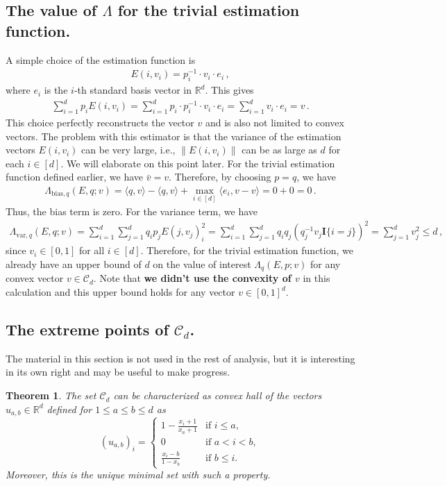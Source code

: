 \documentclass{article}
\theoremstyle{plain}
\newtheorem{theorem}{Theorem}
\theoremstyle{definition}
\theoremstyle{plain}
\newcommand{\R}{\mathbb R}
\newcommand{\cC}{\mathcal C}
\begin{document}
\subsection{The value of $\Lambda$ for the trivial estimation function.}
A simple choice of the estimation function is
\begin{align}
    E(i, v_i) = p_i^{-1} \cdot v_i \cdot e_i\,,
\end{align}
where $e_i$ is the $i$-th standard basis vector in $\R^d$.
This gives
\begin{align}
    \sum_{i=1}^d p_i E(i, v_i) = \sum_{i=1}^d p_i \cdot p_i^{-1} \cdot v_i \cdot e_i = \sum_{i=1}^d v_i \cdot e_i = v\,.
\end{align}
This choice perfectly reconstructs the vector $v$ and is also not limited to convex vectors.
The problem with this estimator is that the variance of the estimation vectors $E(i, v_i)$ can be very large,
i.e., $\|E(i, v_i)\|$ can be as large as $d$ for each $i \in [d]$. We will elaborate on this point later.
For the trivial estimation function defined earlier, we have $\bar{v} = v$.
Therefore, by choosing $p =q$, we have
\begin{align}
    \Lambda_{\text{bias}, q}(E, q ; v)
    = \langle q, v\rangle - \langle q, v \rangle
    + \max_{i \in [d]} \langle e_i, v - v \rangle
    = 0 + 0 = 0\,.
\end{align}
Thus, the bias term is zero.
For the variance term, we have
\begin{align}
    \Lambda_{\text{var}, q}(E, q ; v)
    =
    \sum_{i=1}^d \sum_{j=1}^d q_i p_j E(j, v_j)_i^2
    = \sum_{i=1}^d \sum_{j=1}^d q_i q_j \left( q_j^{-1} v_j \mathbf{I}\{i= j\} \right)^2
    = \sum_{j=1}^d v_j^2 \leq d\,,
\end{align}
since $v_i \in [0, 1]$ for all $i \in [d]$.
Therefore, for the trivial estimation function, we already have an upper bound of $d$ on the value of interest $\Lambda_q(E, p ; v)$ for any convex vector $v \in \cC_d$.
Note that \textbf{we didn't use the convexity of $v$} in this calculation and this upper bound holds for any vector $v \in [0, 1]^d$.

\subsection{The extreme points of $\cC_d$.}
The material in this section is not used in the rest of analysis, but it is interesting in its own right and may be useful to make progress.
\begin{theorem}
    The set $\cC_d$ can be characterized as convex hall of the vectors $u_{a,b} \in \R^d$ defined for $1\leq a \leq b \leq d$ as
    \[
        (u_{a,b})_i = \begin{cases}
            1 - \frac{x_i + 1}{x_a + 1} & \text{if } i \leq a,  \\
            0                           & \text{if } a < i < b, \\
            \frac{x_i - b}{1 - x_b}     & \text{if } b \leq i.
        \end{cases}
    \]
    Moreover, this is the unique minimal set with such a property.
\end{theorem}
\end{document}

